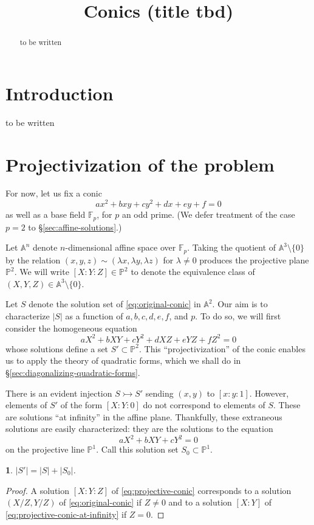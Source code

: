 \documentclass[10pt,a4paper]{amsart}
\numberwithin{equation}{section}
\numberwithin{figure}{section}
\theoremstyle{definition}
\theoremstyle{remark}
\theoremstyle{plain}
\theoremstyle{plain}
\theoremstyle{definition}
\theoremstyle{plain}
\theoremstyle{plain}
\newtheorem{lem}{\protect\lemmaname}[section]
\providecommand{\lemmaname}{Lemma}
\newcommand{\A}{\mathbb{A}}
\renewcommand{\P}{\mathbb{P}}
\newcommand{\F}{\mathbb{F}}
\begin{document}
\title{Conics (title tbd)}
\maketitle

\begin{abstract}
	to be written
\end{abstract}

\tableofcontents

\section{Introduction}
to be written
\section{Projectivization of the problem}
For now, let us fix a conic
\begin{equation}\label{eq:original-conic}
ax^2 + bxy + cy^2 + dx + ey + f = 0
\end{equation}
as well as a base field $\F_p$, for $p$ an odd prime. (We defer treatment of the case $p = 2$ to \S\ref{sec:affine-solutions}.)

Let $\A^n$ denote $n$-dimensional affine space over $\F_p$. Taking the quotient of $\A^3 \setminus \{0\}$ by the relation $(x,y,z) \sim (\lambda x, \lambda y, \lambda z)$ for $\lambda \neq 0$ produces the projective plane $\P^2$. We will write $[X:Y:Z]\in \P^2$ to denote the equivalence class of $(X,Y,Z)\in \A^3 \setminus \{0\}$.

Let $S$ denote the solution set of \eqref{eq:original-conic} in $\A^2$. Our aim is to characterize $|S|$ as a function of $a,b,c,d,e,f$, and $p$.
To do so, we will first consider the homogeneous equation
\begin{equation}\label{eq:projective-conic}
aX^2 + bXY + cY^2 + dXZ + eYZ + fZ^2 = 0
\end{equation}
whose solutions define a set $S'\subset\P^2$. This ``projectivization'' of the conic enables us to apply the theory of quadratic forms, which we shall do in \S\ref{sec:diagonalizing-quadratic-forms}.

There is an evident injection $S \rightarrowtail S'$ sending $(x,y)$ to $[x:y:1]$. However, elements of $S'$ of the form $[X:Y:0]$ do not correspond to elements of $S$. These are solutions ``at infinity'' in the affine plane. Thankfully, these extraneous solutions are easily characterized: they are the solutions to the equation
\begin{equation}\label{eq:projective-conic-at-infinity}
aX^2 + bXY + cY^2 = 0
\end{equation}
on the projective line $\P^1$. Call this solution set $S_0\subset \P^1$.
\begin{lem}
	$|S'| = |S| + |S_0|$.
\end{lem}
\begin{proof}
	A solution $[X:Y:Z]$ of \eqref{eq:projective-conic} corresponds to a solution $(X/Z,Y/Z)$ of \eqref{eq:original-conic} if $Z \neq 0$ and to a solution $[X:Y]$ of \eqref{eq:projective-conic-at-infinity} if $Z=0$.
\end{proof}
\end{document}
